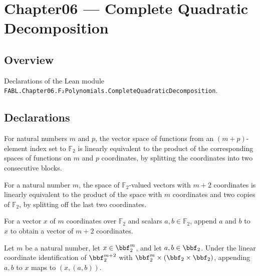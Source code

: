 \chapter{Chapter06 — Complete Quadratic Decomposition}
\section{Overview}

Declarations of the Lean module \texttt{FABL.Chapter06.F₂Polynomials.CompleteQuadraticDecomposition}.

\section{Declarations}

\begin{definition}
\label{FABL.cubeAppendLinearEquiv}
\leanok
{}
For natural numbers $m$ and $p$, the vector space of functions from an $(m+p)$-element
index set to $\mathbb{F}_2$ is linearly equivalent to the product of the corresponding
spaces of functions on $m$ and $p$ coordinates, by splitting the coordinates into two
consecutive blocks.
\end{definition}

\begin{definition}
\label{FABL.splitLastTwoLinearEquiv}
\leanok
{}
For a natural number $m$, the space of $\mathbb{F}_2$-valued vectors with $m+2$
coordinates is linearly equivalent to the product of the space with $m$ coordinates and
two copies of $\mathbb{F}_2$, by splitting off the last two coordinates.
\end{definition}

\begin{definition}
\label{FABL.appendTwo}
\leanok
{}
For a vector $x$ of $m$ coordinates over $\mathbb{F}_2$ and scalars
$a,b\in\mathbb{F}_2$, append $a$ and $b$ to $x$ to obtain a vector of $m+2$ coordinates.
\end{definition}

\begin{theorem}
\label{FABL.splitLastTwoLinearEquiv_appendTwo}
\leanok
{}
Let $m$ be a natural number, let $x\in\bbf_2^m$, and let $a,b\in\bbf_2$. Under the
linear coordinate identification of $\bbf_2^{m+2}$ with
$\bbf_2^m\times(\bbf_2\times\bbf_2)$, appending $a,b$ to $x$ maps to $(x,(a,b))$.
\end{theorem}

